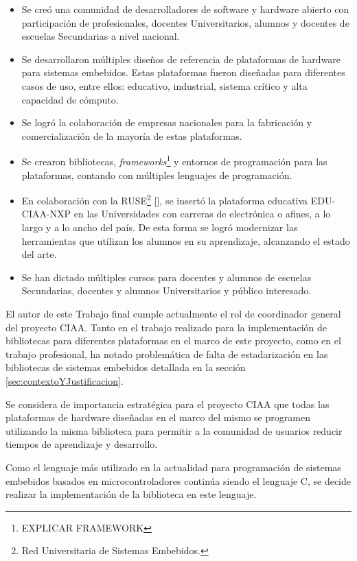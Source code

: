 \begin{itemize}
\item
Se creó una comunidad de desarrolladores de software y hardware abierto con participación de profesionales, docentes Universitarios, alumnos y docentes de escuelas Secundarias a nivel nacional.
\item
Se desarrollaron múltiples diseños de referencia de plataformas de hardware para sistemas embebidos. Estas plataformas fueron diseñadas para diferentes casos de uso, entre ellos: educativo, industrial, sistema crítico y alta capacidad de cómputo.
\item
Se logró la colaboración de empresas nacionales para la fabricación y comercialización de la mayoría de estas plataformas.
\item
Se crearon bibliotecas, \emph{frameworks}\footnote{EXPLICAR FRAMEWORK} y entornos de programación para las plataformas, contando con múltiples lenguajes de programación.
\item
En colaboración con la RUSE\footnote{Red Universitaria de Sistemas Embebidos.} [], se insertó la plataforma educativa EDU-CIAA-NXP en las Universidades con carreras de electrónica o afines, a lo largo y a lo ancho del país. De esta forma se logró modernizar las herramientas que utilizan los alumnos en su aprendizaje, alcanzando el estado del arte.
\item
Se han dictado múltiples cursos para docentes y alumnos de escuelas Secundarias, docentes y alumnos Universitarios y público interesado.
\end{itemize}

El autor de este Trabajo final cumple actualmente el rol de coordinador general del proyecto CIAA. Tanto en el trabajo realizado para la implementación de bibliotecas para diferentes plataformas en el marco de este proyecto, como en el trabajo profesional, ha notado problemática de falta de estadarización en las bibliotecas de sistemas embebidos detallada en la sección \ref{sec:contextoYJustificacion}.

Se considera de importancia estratégica para el proyecto CIAA que todas las plataformas de hardware diseñadas en el marco del mismo se programen utilizando la misma biblioteca para permitir a la comunidad de usuarios reducir tiempos de aprendizaje y desarrollo.

Como el lenguaje más utilizado en la actualidad para programación de sistemas embebidos basados en microcontroladores continúa siendo el lenguaje C, se decide realizar la implementación de la biblioteca en este lenguaje.
